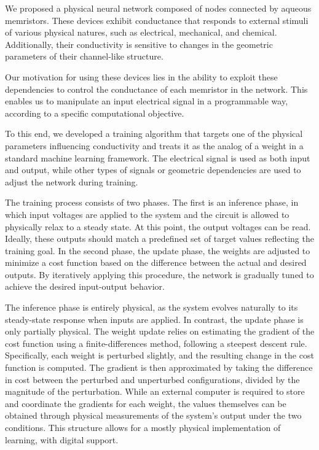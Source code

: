 \documentclass[reprint,superscriptaddress,prb,showkeys]{revtex4-2}
\begin{document}
We proposed a physical neural network composed of nodes connected by aqueous memristors. These devices exhibit conductance that responds to external stimuli of various physical natures, such as electrical, mechanical, and chemical. Additionally, their conductivity is sensitive to changes in the geometric parameters of their channel-like structure.

Our motivation for using these devices lies in the ability to exploit these dependencies to control the conductance of each memristor in the network. This enables us to manipulate an input electrical signal in a programmable way, according to a specific computational objective.

To this end, we developed a training algorithm that targets one of the physical parameters influencing conductivity and treats it as the analog of a weight in a standard machine learning framework. The electrical signal is used as both input and output, while other types of signals or geometric dependencies are used to adjust the network during training.

The training process consists of two phases. The first is an inference phase, in which input voltages are applied to the system and the circuit is allowed to physically relax to a steady state. At this point, the output voltages can be read. Ideally, these outputs should match a predefined set of target values reflecting the training goal. In the second phase, the update phase, the weights are adjusted to minimize a cost function based on the difference between the actual and desired outputs. By iteratively applying this procedure, the network is gradually tuned to achieve the desired input-output behavior.

The inference phase is entirely physical, as the system evolves naturally to its steady-state response when inputs are applied. In contrast, the update phase is only partially physical. The weight update relies on estimating the gradient of the cost function using a finite-differences method, following a steepest descent rule. Specifically, each weight is perturbed slightly, and the resulting change in the cost function is computed. The gradient is then approximated by taking the difference in cost between the perturbed and unperturbed configurations, divided by the magnitude of the perturbation. While an external computer is required to store and coordinate the gradients for each weight, the values themselves can be obtained through physical measurements of the system's output under the two conditions. This structure allows for a mostly physical implementation of learning, with digital support.
\end{document}
